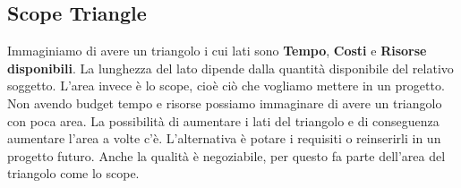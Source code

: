 \subsection{Scope Triangle}

Immaginiamo di avere un triangolo i cui lati sono \textbf{Tempo}, \textbf{Costi} e \textbf{Risorse disponibili}. La lunghezza del lato dipende dalla quantità disponibile del relativo soggetto. L'area invece è lo scope, cioè ciò che vogliamo mettere in un progetto. Non avendo budget tempo e risorse possiamo immaginare di avere un triangolo con poca area.\newline
La possibilità di aumentare i lati del triangolo e di conseguenza aumentare l'area a volte c'è. L'alternativa è potare i requisiti o reinserirli in un progetto futuro. Anche la qualità è negoziabile, per questo fa parte dell'area del triangolo come lo scope.
